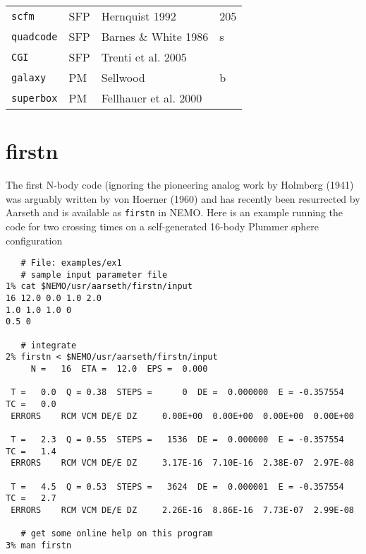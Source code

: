 \begin{center}
\begin{table}[h]
\begin{tabular}{||l|l|l|l||}
{\tt scfm} & SFP & Hernquist 1992 & 205 \\

{\tt quadcode} & SFP & Barnes \& White 1986 & s \\

{\tt CGI} & SFP &  Trenti et al. 2005 & \\

{\tt galaxy} & PM & Sellwood  & b \\

{\tt superbox} & PM &  Fellhauer et al. 2000 & \\


\hline 

\end{tabular}
\label{t:codes}
\end{table}
\end{center}

\section{firstn}

The first N-body code (ignoring the pioneering analog work by 
Holmberg (1941)
was arguably written by von Hoerner (1960)  %
and has recently
been resurrected by Aarseth and is available as {\tt firstn} in NEMO. Here is an
example running the code for two crossing times on a self-generated 16-body
Plummer sphere configuration

\footnotesize\begin{verbatim}
   # File: examples/ex1
   # sample input parameter file
1% cat $NEMO/usr/aarseth/firstn/input
16 12.0 0.0 1.0 2.0
1.0 1.0 1.0 0
0.5 0

   # integrate 
2% firstn < $NEMO/usr/aarseth/firstn/input
     N =   16  ETA =  12.0  EPS =  0.000
 
 T =   0.0  Q = 0.38  STEPS =      0  DE =  0.000000  E = -0.357554  TC =   0.0
 ERRORS    RCM VCM DE/E DZ     0.00E+00  0.00E+00  0.00E+00  0.00E+00
 
 T =   2.3  Q = 0.55  STEPS =   1536  DE =  0.000000  E = -0.357554  TC =   1.4
 ERRORS    RCM VCM DE/E DZ     3.17E-16  7.10E-16  2.38E-07  2.97E-08
 
 T =   4.5  Q = 0.53  STEPS =   3624  DE =  0.000001  E = -0.357554  TC =   2.7
 ERRORS    RCM VCM DE/E DZ     2.26E-16  8.86E-16  7.73E-07  2.99E-08

   # get some online help on this program
3% man firstn
 
\end{verbatim}\normalsize

